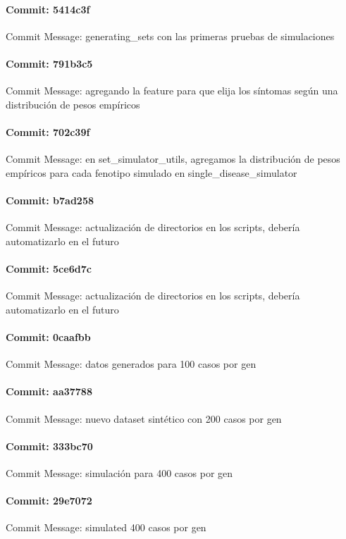 \documentclass{article}
\begin{document}
\paragraph{Commit: 5414c3f}
Commit Message: generating_sets con las primeras pruebas de simulaciones

\paragraph{Commit: 791b3c5}
Commit Message: agregando la feature para que elija los síntomas según una distribución de pesos empíricos

\paragraph{Commit: 702c39f}
Commit Message: en set_simulator_utils, agregamos la distribución de pesos empíricos para cada fenotipo simulado en single_disease_simulator

\paragraph{Commit: b7ad258}
Commit Message: actualización de directorios en los scripts, debería automatizarlo en el futuro

\paragraph{Commit: 5ce6d7c}
Commit Message: actualización de directorios en los scripts, debería automatizarlo en el futuro

\paragraph{Commit: 0caafbb}
Commit Message: datos generados para 100 casos por gen

\paragraph{Commit: aa37788}
Commit Message: nuevo dataset sintético con 200 casos por gen

\paragraph{Commit: 333bc70}
Commit Message: simulación para 400 casos por gen

\paragraph{Commit: 29e7072}
Commit Message: simulated 400 casos por gen
\end{document}
